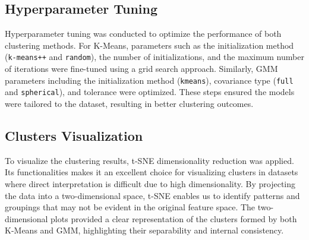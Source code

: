     \subsection{Hyperparameter Tuning}
    
        Hyperparameter tuning was conducted to optimize the performance of both clustering methods. For K-Means, parameters such as the initialization method (\texttt{k-means++} and \texttt{random}), the number of initializations, and the maximum number of iterations were fine-tuned using a grid search approach. Similarly, GMM parameters including the initialization method (\texttt{kmeans}), covariance type (\texttt{full} and \texttt{spherical}), and tolerance were optimized. These steps ensured the models were tailored to the dataset, resulting in better clustering outcomes.

    \subsection{Clusters Visualization}
    
        To visualize the clustering results, t-SNE dimensionality reduction was applied. Its functionalities makes it an excellent choice for visualizing clusters in datasets where direct interpretation is difficult due to high dimensionality. By projecting the data into a two-dimensional space, t-SNE enables us to identify patterns and groupings that may not be evident in the original feature space. The two-dimensional plots provided a clear representation of the clusters formed by both K-Means and GMM, highlighting their separability and internal consistency.
        
